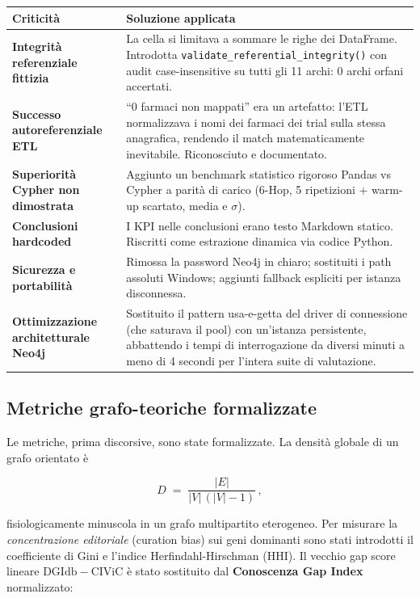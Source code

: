 \documentclass[11pt,a4paper]{article}
\newcommand{\code}[1]{\texttt{\small #1}}
\begin{document}
\begin{center}
\small
\begin{tabularx}{\textwidth}{@{}>{\bfseries\color{gapred}}p{4.6cm} X@{}}
\toprule
Criticit\`a & Soluzione applicata \\
\midrule
Integrit\`a referenziale fittizia & La cella si limitava a sommare le righe dei DataFrame. Introdotta \code{validate\_referential\_integrity()} con audit case-insensitive su tutti gli 11 archi: 0 archi orfani accertati. \\
Successo autoreferenziale ETL & ``0 farmaci non mappati'' era un artefatto: l'ETL normalizzava i nomi dei farmaci dei trial sulla stessa anagrafica, rendendo il match matematicamente inevitabile. Riconosciuto e documentato. \\
Superiorit\`a Cypher non dimostrata & Aggiunto un benchmark statistico rigoroso Pandas vs Cypher a parit\`a di carico (6-Hop, 5 ripetizioni + warm-up scartato, media e $\sigma$). \\
Conclusioni hardcoded & I KPI nelle conclusioni erano testo Markdown statico. Riscritti come estrazione dinamica via codice Python. \\
Sicurezza e portabilit\`a & Rimossa la password Neo4j in chiaro; sostituiti i path assoluti Windows; aggiunti fallback espliciti per istanza disconnessa. \\
\rowcolor{softbg}Ottimizzazione architetturale Neo4j & Sostituito il pattern usa-e-getta del driver di connessione (che saturava il pool) con un'istanza persistente, abbattendo i tempi di interrogazione da diversi minuti a meno di 4 secondi per l'intera suite di valutazione. \\
\bottomrule
\end{tabularx}
\end{center}

\subsection{Metriche grafo-teoriche formalizzate}
Le metriche, prima discorsive, sono state formalizzate. La densit\`a globale di un grafo orientato \`e

\[
D \;=\; \frac{|E|}{|V|\,(|V|-1)}\,,
\]

fisiologicamente minuscola in un grafo multipartito eterogeneo. Per misurare la \emph{concentrazione editoriale} (curation bias) sui geni dominanti sono stati introdotti il coefficiente di Gini e l'indice Herfindahl-Hirschman (HHI). Il vecchio gap score lineare $\mathrm{DGIdb}-\mathrm{CIViC}$ \`e stato sostituito dal \textbf{Conoscenza Gap Index} normalizzato:
\end{document}

